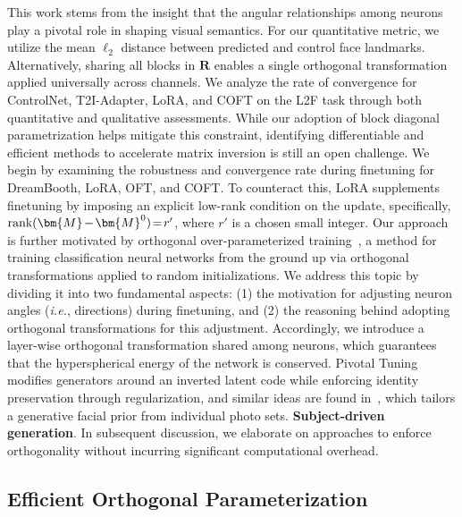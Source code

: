 {This work stems from the insight that the angular relationships among neurons play a pivotal role in shaping visual semantics. For our quantitative metric, we utilize the mean $\ell_2$ distance between predicted and control face landmarks. Alternatively, sharing all blocks in $\bm{R}$ enables a single orthogonal transformation applied universally across channels. We analyze the rate of convergence for ControlNet, T2I-Adapter, LoRA, and COFT on the L2F task through both quantitative and qualitative assessments. While our adoption of block diagonal parametrization helps mitigate this constraint, identifying differentiable and efficient methods to accelerate matrix inversion is still an open challenge. We begin by examining the robustness and convergence rate during finetuning for DreamBooth, LoRA, OFT, and COFT. To counteract this, LoRA supplements finetuning by imposing an explicit low-rank condition on the update, specifically, $\thickmuskip=2mu \medmuskip=2mu \text{rank}(\bm{M} - \bm{M}^0)=r'$, where $r'$ is a chosen small integer. Our approach is further motivated by orthogonal over-parameterized training~\cite{liu2021orthogonal}, a method for training classification neural networks from the ground up via orthogonal transformations applied to random initializations. We address this topic by dividing it into two fundamental aspects: (1) the motivation for adjusting neuron angles (\emph{i.e.}, directions) during finetuning, and (2) the reasoning behind adopting orthogonal transformations for this adjustment. Accordingly, we introduce a layer-wise orthogonal transformation shared among neurons, which guarantees that the hyperspherical energy of the network is conserved. Pivotal Tuning~\cite{roich2022pivotal} modifies generators around an inverted latent code while enforcing identity preservation through regularization, and similar ideas are found in~\cite{nitzan2022mystyle}, which tailors a generative facial prior from individual photo sets. \textbf{Subject-driven generation}. In subsequent discussion, we elaborate on approaches to enforce orthogonality without incurring significant computational overhead. \subsection{Efficient Orthogonal Parameterization}\label{sect:eff_ortho}

}
